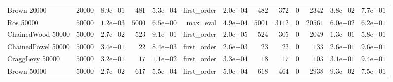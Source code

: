 \begin{longtable}[c]{lrrrrrrrrrrrr}
Brown 20000 & \(20000\) & \( 8.9\)e\(+01\) & \(  481\) & \( 5.3\)e\(-04\) & first\_order & \( 2.0\)e\(+04\) & \(  482\) & \(  372\) & \(    0\) & \( 2342\) & \( 3.8\)e\(-02\) & \( 7.7\)e\(+01\) \\
Ros 50000 & \(50000\) & \( 1.2\)e\(+03\) & \( 5000\) & \( 6.5\)e\(+00\) & max\_eval & \( 4.9\)e\(+04\) & \( 5001\) & \( 3112\) & \(    0\) & \(20561\) & \( 6.0\)e\(-02\) & \( 6.2\)e\(+01\) \\
ChainedWood 50000 & \(50000\) & \( 2.7\)e\(+02\) & \(  523\) & \( 9.1\)e\(-01\) & first\_order & \( 2.0\)e\(+05\) & \(  524\) & \(  305\) & \(    0\) & \( 2049\) & \( 1.3\)e\(-01\) & \( 5.8\)e\(+01\) \\
ChainedPowel 50000 & \(50000\) & \( 3.4\)e\(+01\) & \(   22\) & \( 8.4\)e\(-03\) & first\_order & \( 2.6\)e\(-03\) & \(   23\) & \(   22\) & \(    0\) & \(  133\) & \( 2.6\)e\(-01\) & \( 9.6\)e\(+01\) \\
CraggLevy 50000 & \(50000\) & \( 3.2\)e\(+01\) & \(   17\) & \( 1.1\)e\(-02\) & first\_order & \( 3.3\)e\(+04\) & \(   18\) & \(   17\) & \(    0\) & \(  103\) & \( 3.1\)e\(-01\) & \( 9.4\)e\(+01\) \\
Brown 50000 & \(50000\) & \( 2.7\)e\(+02\) & \(  617\) & \( 5.5\)e\(-04\) & first\_order & \( 5.0\)e\(+04\) & \(  618\) & \(  464\) & \(    0\) & \( 2938\) & \( 9.3\)e\(-02\) & \( 7.5\)e\(+01\) \\
\hline 
\end{longtable}
